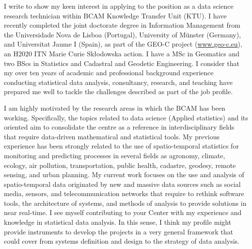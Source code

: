 \documentclass[11pt, a4paper]{awesome-cv}
\begin{document}
\makecvheader[R]


\makelettertitle

\begin{cvletter}
I write to show my keen interest in applying to the position as a data science research technician within BCAM Knowledge Transfer Unit (KTU). I have recently completed the joint doctorate degree in Information Management from the Universidade Nova de Lisboa (Portugal), University of Münster (Germany), and Universitat Jaume I (Spain), as part of the GEO-C project (\url{www.geo-c.eu}), an H2020 ITN Marie Curie Skłodowska action. I have a MSc in Geomatics and two BScs in Statistics and Cadastral and Geodetic Engineering. I consider that my over ten years of academic and professional background experience conducting statistical data analysis, consultancy, research, and teaching have prepared me well to tackle the challenges described as part of the job profile.\par
I am highly motivated by the research areas in which the BCAM has been working. Specifically, the topics related to data science (Applied statistics) and its oriented aim to consolidate the centre as a reference in interdisciplinary fields that require data-driven mathematical and statistical tools. My previous experience has been strongly related to the use of spatio-temporal statistics for monitoring and predicting processes in several fields as agronomy, climate, ecology, air pollution, transportation, public health, cadastre, geodesy, remote sensing, and urban planning. My current work focuses on the use and analysis of spatio-temporal data originated by new and massive data sources such as social media, sensors, and telecommunication networks that require to rethink software tools, the architecture of systems, and methods of analysis to provide solutions in near real-time. I see myself contributing to your Center with my experience and knowledge in statistical data analysis. In this sense, I think my profile might provide instruments to develop the projects in a very general framework that could cover from systems definition and design to the strategy of data analysis.\par

\end{cvletter}
\end{document}
